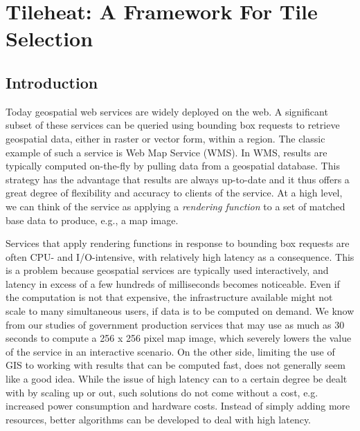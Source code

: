 \documentclass[11pt, oneside]{report}
\begin{document}
{%



\chapter{Tileheat: A Framework For Tile Selection}
\label{chapter:tileheat}
\section{Introduction}

Today geospatial web services are widely deployed on the web. A significant subset of these services can be queried using bounding box requests to retrieve geospatial data, either in raster or vector form, within a region. The classic example of such a service is Web Map Service (WMS). In WMS, results are typically computed on-the-fly by pulling data from a geospatial database. This strategy has the advantage that results are always up-to-date and it thus offers a great degree of flexibility and accuracy to clients of the service. At a high level, we can think of the service as applying a \emph{rendering function} to a set of matched base data to produce, e.g., a map image.

Services that apply rendering functions in response to bounding box requests are often CPU- and I/O-intensive, with relatively high latency as a consequence. This is a problem because geospatial services are typically used interactively, and latency in excess of a few hundreds of milliseconds becomes noticeable. Even if the computation is not that expensive, the infrastructure available might not scale to many simultaneous users, if data is to be computed on demand. We know from our studies of government production services that may use as much as 30 seconds to compute a 256 x 256 pixel map image, which severely lowers the value of the service in an interactive scenario. On the other side, limiting the use of GIS to working with results that can be computed fast, does not generally seem like a good idea. While the issue of high latency can to a certain degree be dealt with by scaling up or out, such solutions do not come without a cost, e.g. increased power consumption and hardware costs. Instead of simply adding more resources, better algorithms can be developed to deal with high latency.

}
\end{document}
